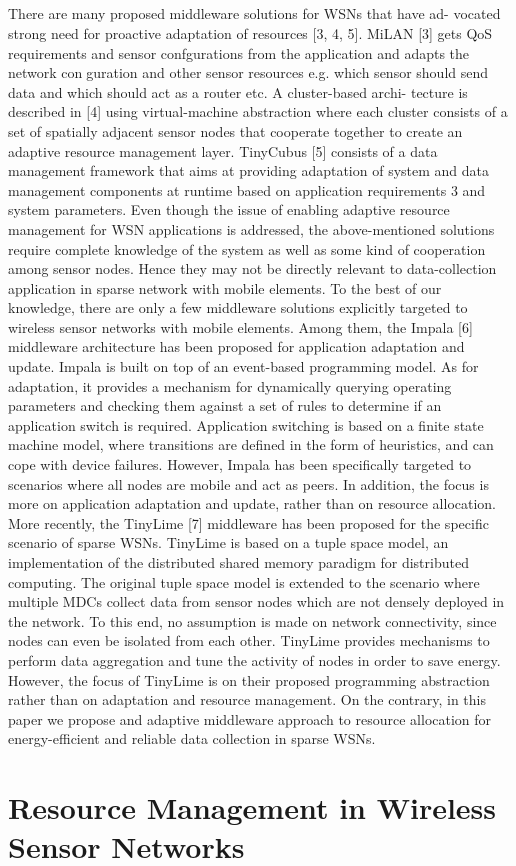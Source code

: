 \subsection{}
There are many proposed middleware solutions for WSNs that have ad-
vocated strong need for proactive adaptation of resources [3, 4, 5]. MiLAN
[3] gets QoS requirements and sensor
confgurations from the application and adapts the network conguration and other sensor resources e.g. which sensor
should send data and which should act as a router etc. A cluster-based archi-
tecture is described in [4] using virtual-machine abstraction where each cluster
consists of a set of spatially adjacent sensor nodes that cooperate together to
create an adaptive resource management layer. TinyCubus [5] consists of a
data management framework that aims at providing adaptation of system and
data management components at runtime based on application requirements
3
and system parameters. Even though the issue of enabling adaptive resource
management for WSN applications is addressed, the above-mentioned solutions
require complete knowledge of the system as well as some kind of cooperation
among sensor nodes. Hence they may not be directly relevant to data-collection
application in sparse network with mobile elements.
To the best of our knowledge, there are only a few middleware solutions
explicitly targeted to wireless sensor networks with mobile elements. Among
them, the Impala [6] middleware architecture has been proposed for application
adaptation and update. Impala is built on top of an event-based programming
model. As for adaptation, it provides a mechanism for dynamically querying
operating parameters and checking them against a set of rules to determine
if an application switch is required. Application
switching is based on a finite state machine
model, where transitions are defined in the form
of heuristics, and can cope with device failures.
However, Impala has been specifically targeted to scenarios where all nodes are mobile and act as peers. In addition, the focus is more on application adaptation and update, rather than on resource
allocation. More recently, the TinyLime [7] middleware has been proposed for
the specific scenario of sparse WSNs. TinyLime
is based on a tuple space model, an implementation of the distributed shared memory paradigm for distributed
computing. The original tuple space model is extended to the scenario where
multiple MDCs collect data from sensor nodes which are not densely deployed in
the network. To this end, no assumption is made on network connectivity, since
nodes can even be isolated from each other. TinyLime provides mechanisms to
perform data aggregation and tune the activity of nodes in order to save energy.
However, the focus of TinyLime is on their proposed programming abstraction
rather than on adaptation and resource management. On the contrary, in this
paper we propose and adaptive middleware approach to resource allocation for
energy-efficient and reliable data collection in
sparse WSNs. \section{Resource Management in Wireless Sensor
Networks}

